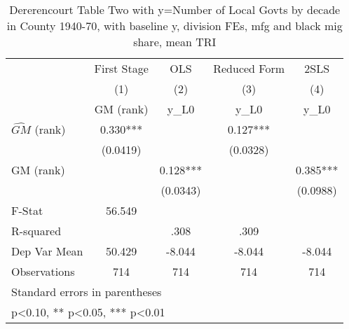 \begin{table}[htbp]\centering
\def\sym#1{\ifmmode^{#1}\else\(^{#1}\)\fi}
\caption{Dererencourt Table Two with y=Number of Local Govts by decade in County 1940-70, with baseline y, division FEs, mfg and black mig share, mean TRI}
\begin{tabular}{l*{4}{c}}
\toprule
                    & First Stage   &         OLS   &Reduced Form   &        2SLS   \\
                    &\multicolumn{1}{c}{(1)}&\multicolumn{1}{c}{(2)}&\multicolumn{1}{c}{(3)}&\multicolumn{1}{c}{(4)}\\
                    &\multicolumn{1}{c}{GM  (rank)}&\multicolumn{1}{c}{y\_L0}&\multicolumn{1}{c}{y\_L0}&\multicolumn{1}{c}{y\_L0}\\
\midrule
$\hat{GM}$ (rank)   &       0.330***&               &       0.127***&               \\
                    &    (0.0419)   &               &    (0.0328)   &               \\
\addlinespace
GM  (rank)          &               &       0.128***&               &       0.385***\\
                    &               &    (0.0343)   &               &    (0.0988)   \\
\midrule
F-Stat              &      56.549   &               &               &               \\
R-squared           &               &        .308   &        .309   &               \\
Dep Var Mean        &      50.429   &      -8.044   &      -8.044   &      -8.044   \\
Observations        &         714   &         714   &         714   &         714   \\
\bottomrule
\multicolumn{5}{l}{\footnotesize Standard errors in parentheses}\\
\multicolumn{5}{l}{\footnotesize * p<0.10, ** p<0.05, *** p<0.01}\\
\end{tabular}
\end{table}
